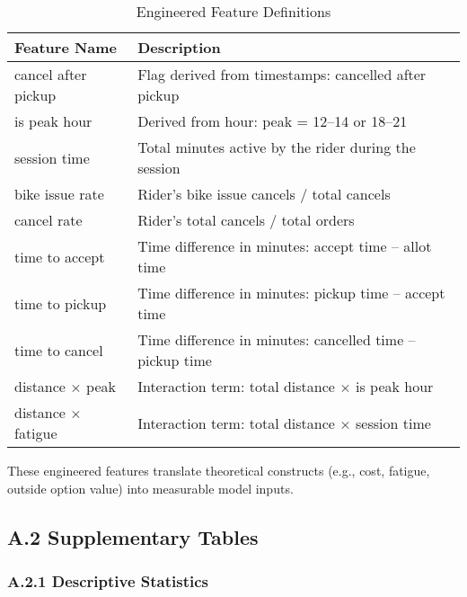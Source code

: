 \begin{table}[H]
\centering
\caption{Engineered Feature Definitions}
\label{tab:engineered_features}
\begin{tabular}{p{4.2cm} p{10.3cm}}
\toprule
\textbf{Feature Name} & \textbf{Description} \\
\midrule
cancel after pickup & Flag derived from timestamps: cancelled after pickup \\
is peak hour & Derived from hour: peak = 12--14 or 18--21 \\
session time & Total minutes active by the rider during the session \\
bike issue rate & Rider's bike issue cancels / total cancels \\
cancel rate & Rider's total cancels / total orders \\
time to accept & Time difference in minutes: accept time -- allot time \\
time to pickup & Time difference in minutes: pickup time -- accept time \\
time to cancel & Time difference in minutes: cancelled time -- pickup time \\
distance $\times$ peak & Interaction term: total distance $\times$ is peak hour \\
distance $\times$ fatigue & Interaction term: total distance $\times$ session time \\
\bottomrule
\end{tabular}
\end{table}

These engineered features translate theoretical constructs (e.g., cost, fatigue, outside option value) into measurable model inputs.

\subsection*{A.2 Supplementary Tables}
\subsubsection*{A.2.1 Descriptive Statistics}

